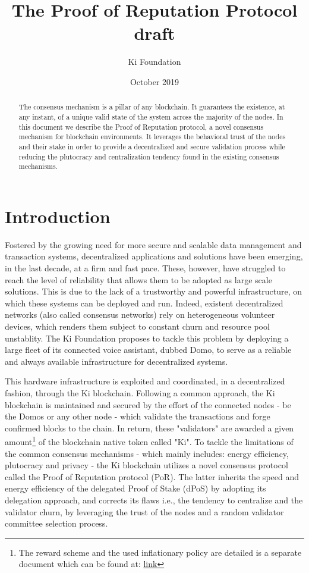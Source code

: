 \documentclass[]{article}
\title{The Proof of Reputation Protocol \small{draft}}
\author{Ki Foundation}
\date{October 2019}
\begin{document}
\maketitle
\begin{abstract}
The consensus mechanism is a pillar of any blockchain. It guarantees the existence, at any instant, of a unique valid state of the system across the majority of the nodes. In this document we describe the Proof of Reputation protocol, a novel consensus mechanism for blockchain environments. It leverages the behavioral trust of the nodes and their stake in order to provide a decentralized and secure validation process while reducing the plutocracy and centralization tendency found in the existing consensus mechanisms.    
\end{abstract}
\section{Introduction}
\label{sec:intro}
Fostered by the growing need for more secure and scalable data management and transaction systems, decentralized applications and solutions have been emerging, in the last decade, at a firm and fast pace. These, however, have struggled to reach the level of reliability that allows them to be adopted as large scale solutions. This is due to the lack of a trustworthy and powerful infrastructure, on which these systems can be deployed and run. Indeed, existent decentralized networks (also called consensus networks) rely on heterogeneous volunteer devices, which renders them subject to constant churn and resource pool unstablity. The Ki Foundation  proposes to tackle this problem by deploying a large fleet of its connected voice assistant, dubbed Domo, to serve as a reliable and always available infrastructure for decentralized systems.

This hardware infrastructure is exploited and coordinated, in a decentralized fashion, through the Ki blockchain. Following a common approach, the Ki blockchain is maintained and secured by the effort of the connected nodes - be the Domos or any other node - which validate the transactions and forge confirmed blocks to the chain. In return, these "validators" are awarded a given amount\footnote{The reward scheme and the used inflationary policy are detailed is a separate document which can be found at: \url{link} } of the blockchain native token called "Ki". To tackle the limitations of the common consensus mechanisms - which mainly includes: energy efficiency, plutocracy and privacy - the Ki blockchain utilizes a novel consensus protocol called the Proof of Reputation protocol (PoR). The latter inherits the speed and energy efficiency of the delegated Proof of Stake (dPoS) by adopting its delegation approach, and corrects its flaws i.e., the tendency to centralize and the validator churn, by leveraging the trust of the nodes and a random validator committee selection process.                  
\end{document}
